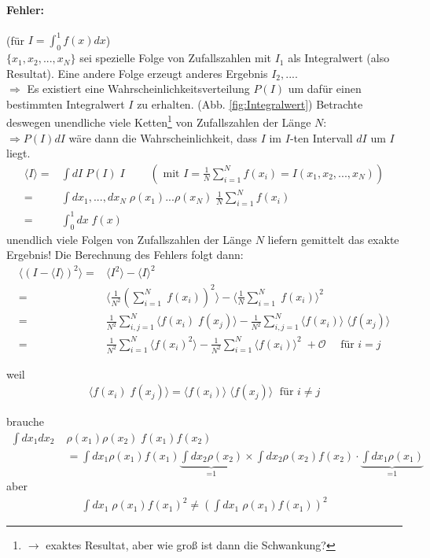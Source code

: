 \documentclass[12pt]{article}
\begin{document}
\paragraph{Fehler:} (für $I = \int_0^1 f(x) dx$)\\
$\{ x_1, x_2,..., x_N\}$ sei spezielle Folge von Zufallszahlen mit $I_1$ als Integralwert (also Resultat). Eine andere Folge erzeugt anderes Ergebnis $I_2,...$. \\
$\Rightarrow$ Es existiert eine Wahrscheinlichkeitsverteilung $P(I)$ um dafür einen bestimmten Integralwert $I$ zu erhalten.  (Abb. \ref{fig:Integralwert})
Betrachte deswegen unendliche viele Ketten\footnote{$\to$ exaktes Resultat, aber wie groß ist dann die Schwankung?} von Zufallszahlen der Länge $N$:\\
$\Rightarrow P(I) dI$ wäre dann die Wahrscheinlichkeit, dass $I$ im $I$-ten Intervall $dI$ um $I$ liegt.
\begin{align}
\langle I \rangle =& \int dI \; P(I) \; I \; \quad \quad \left( \mbox{ mit } I= \frac{1}{N} \sum_{i=1}^N f(x_i)= I(x_1,x_2,...,x_N) \right) \\
=& \int dx_1,...,dx_N \; \rho(x_1) ... \rho(x_N) \; \frac{1}{N} \sum_{i=1}^N f(x_i) \\
=& \int_0^1 dx \; f(x) 
\end{align}
unendlich viele Folgen von Zufallszahlen der Länge $N$ liefern gemittelt das exakte Ergebnis! Die Berechnung des Fehlers folgt dann:
\begin{align}
\langle (I- \langle I \rangle)^2 \rangle =& \langle I^2 \rangle - \langle I \rangle ^2 \\
=& \langle \frac{1}{N^2} \left( \sum_{i=1}^N \; f(x_i) \right) ^2 \rangle - \langle \frac{1}{N} \sum_{i=1}^N \; f(x_i)\rangle^2 \\
=& \frac{1}{N^2} \sum_{i,j=1}^N \langle f(x_i) \; f(x_j) \rangle - \frac{1}{N^2} \sum_{i,j=1}^N \langle f(x_i) \rangle \; \langle f(x_j) \rangle \\
=& \frac{1}{N^2} \sum_{i=1}^N \langle f(x_i)^2 \rangle - \frac{1}{N^2} \sum_{i=1}^N \langle f(x_i) \rangle ^2 \; +\mathcal{O} \quad \mbox{ für } i = j
\end{align}

weil
\begin{align*}
\langle f(x_i) \; f(x_j) \rangle = \langle f(x_i) \rangle \; \langle f(x_j) \rangle \; \mbox{ für } i \neq j
\end{align*}

brauche
\begin{align}
\int dx_1 dx_2 \; & \rho(x_1) \rho(x_2) \; f(x_1) f(x_2) \\
&= \int dx_1 \rho(x_1)f(x_1)  \underbrace{\int dx_2 \rho(x_2)}_\text{=1}\times  \int dx_2 \rho(x_2)f(x_2) \cdot \underbrace{\int dx_1 \rho(x_1)}_\text{=1} 
\end{align} 
aber
\begin{align*}
\int dx_1 \; \rho (x_1) f(x_1)^2 \neq \left( \int dx_1 \; \rho (x_1) f(x_1) \right) ^2
\end{align*}
\end{document}
